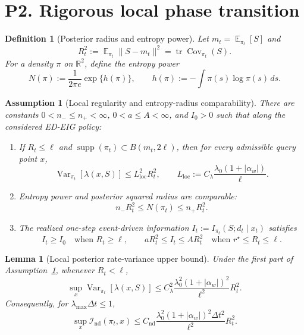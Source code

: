 \documentclass[11pt]{article}
\newtheorem{lemma}[theorem]{Lemma}
\newtheorem{definition}[theorem]{Definition}
\newtheorem{assumption}[theorem]{Assumption}
\DeclareMathOperator{\E}{\mathbb{E}}
\DeclareMathOperator{\Var}{\mathrm{Var}}
\DeclareMathOperator{\Cov}{\mathrm{Cov}}
\DeclareMathOperator{\supp}{\mathrm{supp}}
\newcommand{\R}{\mathbb{R}}
\newcommand{\dt}{\Delta t}
\begin{document}
\section{P2. Rigorous local phase transition}

\begin{definition}[Posterior radius and entropy power]\label{def:radius-entropy}
Let $m_t=\E_{\pi_t}[S]$ and
\[
        R_t^2:=\E_{\pi_t}\|S-m_t\|^2=\operatorname{tr}\Cov_{\pi_t}(S).
\]
For a density $\pi$ on $\R^2$, define the entropy power
\[
        N(\pi):=\frac{1}{2\pi e}\exp\{h(\pi)\},
        \qquad
        h(\pi):=-\int \pi(s)\log\pi(s)\,ds.
\]
\end{definition}

\begin{assumption}[Local regularity and entropy-radius comparability]\label{ass:phase}
There are constants $0<n_-\leq n_+<\infty$, $0<a\leq A<\infty$, and $I_0>0$ such that along the considered ED-EIG policy:
\begin{enumerate}
\item If $R_t\leq \ell$ and $\supp(\pi_t)\subset B(m_t,2\ell)$, then for every admissible query point $x$,
\begin{equation}
        \Var_{\pi_t}[\lambda(x,S)]
        \leq
        L_{\mathrm{loc}}^2R_t^2,
        \qquad
        L_{\mathrm{loc}}
        :=
        C_{\lambda}\frac{\lambda_0(1+|\alpha_w|)}{\ell}.
        \label{eq:local-var-upper}
\end{equation}
\item Entropy power and posterior squared radius are comparable:
\begin{equation}
        n_-R_t^2\leq N(\pi_t)\leq n_+R_t^2.
        \label{eq:entropy-radius-comparable}
\end{equation}
\item The realized one-step event-driven information
$I_t:=I_{\pi_t}(S;d_t\mid x_t)$ satisfies
\begin{equation}
        I_t\geq I_0 \quad\text{when } R_t\geq \ell,
        \qquad
        aR_t^2\leq I_t\leq AR_t^2
        \quad\text{when } r^\star\leq R_t\leq \ell .
        \label{eq:phase-information-rates}
\end{equation}
\end{enumerate}
\end{assumption}

\begin{lemma}[Local posterior rate-variance upper bound]\label{lem:local-var}
Under the first part of Assumption~\ref{ass:phase}, whenever $R_t<\ell$,
\begin{equation}
        \sup_x \Var_{\pi_t}[\lambda(x,S)]
        \leq
        C_{\lambda}^2
        \frac{\lambda_0^2(1+|\alpha_w|)^2}{\ell^2}
        R_t^2 .
        \label{eq:local-var-final}
\end{equation}
Consequently, for $\lambda_{\max}\dt\leq 1$,
\begin{equation}
        \sup_x \mathcal{I}_{\mathrm{nd}}(\pi_t,x)
        \leq
        C_{\mathrm{nd}}
        \frac{\lambda_0^2(1+|\alpha_w|)^2\dt^2}{\ell^2}
        R_t^2 .
        \label{eq:local-ndi-upper}
\end{equation}
\end{lemma}
\end{document}
